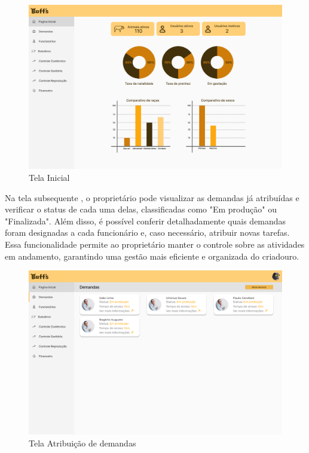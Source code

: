 \newpage
\begin{figure}[!h]
\centering
\caption{Tela Inicial}%
\label{fig:ux-pc01}
\includegraphics[scale=0.3]{Illustrations/UX-PC/Pc-01.png}
\end{figure}

Na tela subsequente , o proprietário pode visualizar as demandas já atribuídas e verificar o status de cada uma delas, classificadas como "Em produção" ou "Finalizada". Além disso, é possível conferir detalhadamente quais demandas foram designadas a cada funcionário e, caso necessário, atribuir novas tarefas. Essa funcionalidade permite ao proprietário manter o controle sobre as atividades em andamento, garantindo uma gestão mais eficiente e organizada do criadouro.

\begin{figure}[!h]
\centering
\caption{Tela Atribuição de demandas}%
\label{fig:ux-pc02}
\includegraphics[scale=0.3]{Illustrations/UX-PC/Pc-02.png}
\end{figure}

